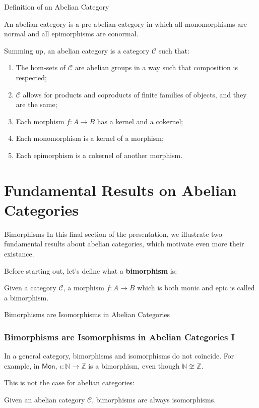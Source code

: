 \documentclass{beamer}
\newcommand{\NN}{\mathbb{N}}
\newcommand{\ZZ}{\mathbb{Z}}
\newcommand{\cat}[1]{\mathsf{#1}}
\begin{document}
\begin{frame}{Definition of an Abelian Category}
    \begin{definition}
        An abelian category is a pre-abelian category in which all monomorphisms are normal
        and all epimorphisms are conormal.
    \end{definition}

    Summing up, an abelian category is a category $\mathcal{C}$ such that:
    \begin{enumerate}
        \item The hom-sets of $\mathcal{C}$ are abelian groups in a way such that
            composition is respected;
        \item $\mathcal{C}$ allows for products and coproducts of finite families of objects, and
            they are the same;
        \item Each morphism $f : A \to B$ has a kernel and a cokernel;
        \item Each monomorphism is a kernel of a morphism;
        \item Each epimorphism is a cokernel of another morphism.
    \end{enumerate}
\end{frame}


\section{Fundamental Results on Abelian Categories}

\begin{frame}{Bimorphisms}
    In this final section of the presentation, we illustrate
    two fundamental results about abelian categories, which
    motivate even more their existance. \medskip
    
    Before starting out, let's
    define what a \textbf{bimorphism} is:

    \begin{definition}[Bimorphism]
        Given a category $\mathcal{C}$, a morphism
        $f : A \to B$ which is both monic and epic is
        called a bimorphism. 
    \end{definition}
\end{frame}

\begin{frame}{Bimorphisms are Isomorphisms in Abelian Categories}
    \frametitle{Bimorphisms are Isomorphisms in Abelian Categories I}

    In a general category, bimorphisms and isomorphisms do not
    coincide. For example, in $\cat{Mon}$, $\iota : \NN \to \ZZ$
    is a bimorphism, even though $\NN \not\cong \ZZ$. \medskip

    This is not the case for abelian categories:
    \begin{theorem}
        Given an abelian category $\mathcal{C}$, bimorphisms are
        always isomorphisms.
    \end{theorem}
\end{frame}
\end{document}
